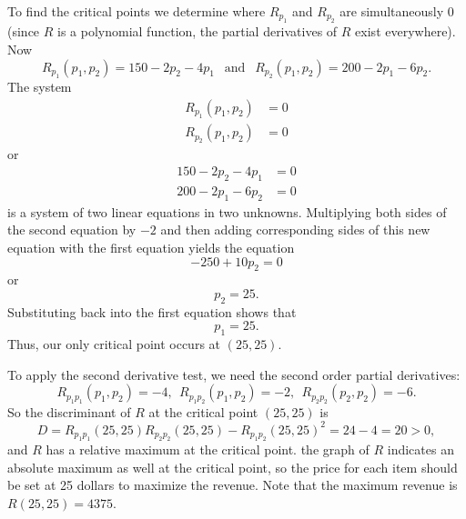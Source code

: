 \begin{activitySolution}
\ba 
\item To find the critical points we determine where $R_{p_1}$ and $R_{p_2}$ are simultaneously 0 (since $R$ is a polynomial function, the partial derivatives of $R$ exist everywhere).  Now
\[R_{p_1}(p_1,p_2) = 150 - 2p_2 - 4p_1 \ \ \text{ and } \ \ R_{p_2}(p_1,p_2) = 200 - 2p_1 - 6p_2.\]
The system
\begin{align*}
R_{p_1}(p_1,p_2) &= 0 \\
R_{p_2}(p_1,p_2) &= 0
\end{align*}
or
\begin{align*}
150 - 2p_2 - 4p_1 &= 0 \\
200 - 2p_1 - 6p_2 &= 0
\end{align*}
is a system of two linear equations in two unknowns. Multiplying both sides of the second equation by $-2$ and then adding corresponding sides of this new equation with the first equation yields the equation
\[-250 + 10p_2 = 0\]
or
\[p_2 = 25.\]
Substituting back into the first equation shows that
\[p_1 = 25.\]
Thus, our only critical point occurs at $(25, 25)$. 

\item To apply the second derivative test, we need the second order partial derivatives:
\[R_{p_1p_1}(p_1,p_2) = -4, \ \ R_{p_1p_2}(p_1,p_2) = -2, \ \ R_{p_2p_2}(p_2,p_2) = -6.\]
So the discriminant of $R$ at the critical point $(25,25)$ is 
\[D = R_{p_1p_1}(25,25) R_{p_2p_2}(25,25) - R_{p_1p_2}(25,25)^2 = 24-4=20 > 0,\]
and $R$ has a relative maximum at the critical point. the graph of $R$ indicates an absolute maximum as well at the critical point, so the price for each item should be set at 25 dollars to maximize the revenue. Note that the maximum revenue is $R(25,25) = 4375$. 

\ea
\end{activitySolution}

\aftera 